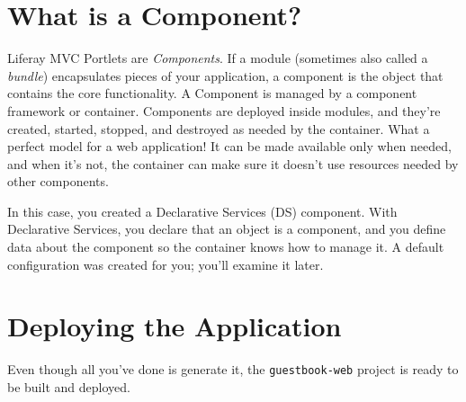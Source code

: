 \section{What is a Component?}\label{what-is-a-component}

Liferay MVC Portlets are \emph{Components}. If a module (sometimes also
called a \emph{bundle}) encapsulates pieces of your application, a
component is the object that contains the core functionality. A
Component is managed by a component framework or container. Components
are deployed inside modules, and they're created, started, stopped, and
destroyed as needed by the container. What a perfect model for a web
application! It can be made available only when needed, and when it's
not, the container can make sure it doesn't use resources needed by
other components.

In this case, you created a Declarative Services (DS) component. With
Declarative Services, you declare that an object is a component, and you
define data about the component so the container knows how to manage it.
A default configuration was created for you; you'll examine it later.

\section{Deploying the Application}\label{deploying-the-application}

Even though all you've done is generate it, the \texttt{guestbook-web}
project is ready to be built and deployed.

